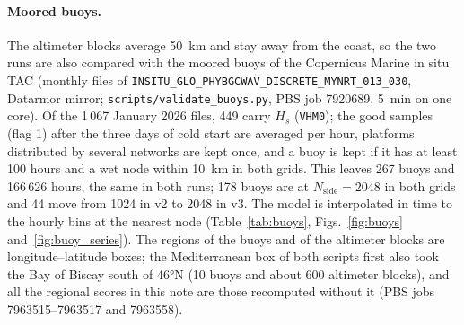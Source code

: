 \documentclass[11pt,a4paper]{article}
\newcommand{\nside}{N_{\mathrm{side}}}
\begin{document}
\paragraph{Moored buoys.} The altimeter blocks average \SI{50}{km} and stay
away from the coast, so the two runs are also compared with the moored
buoys of the Copernicus Marine in situ TAC (monthly files of
\texttt{INSITU\_GLO\_PHYBGCWAV\_DISCRETE\_MYNRT\_013\_030}, Datarmor mirror;
\texttt{scripts/validate\_buoys.py}, PBS job 7920689, \SI{5}{min} on one
core). Of the 1\,067 January 2026 files, 449 carry $H_s$
(\texttt{VHM0}); the good samples (flag 1) after the three days of cold
start are averaged per hour, platforms distributed by several networks are
kept once, and a buoy is kept if it has at least 100 hours and a wet node
within \SI{10}{km} in both grids. This leaves 267 buoys and 166\,626 hours,
the same in both runs; 178 buoys are at $\nside=2048$ in both grids and 44
move from 1024 in v2 to 2048 in v3. The model is interpolated in time to
the hourly bins at the nearest node (Table~\ref{tab:buoys},
Figs.~\ref{fig:buoys} and~\ref{fig:buoy_series}). The regions of the
buoys and of the altimeter blocks are longitude--latitude boxes; the
Mediterranean box of both scripts first also took the Bay of Biscay south
of \ang{46}N (10 buoys and about 600 altimeter blocks), and all the
regional scores in this note are those recomputed without it (PBS jobs
7963515--7963517 and 7963558).
\end{document}
